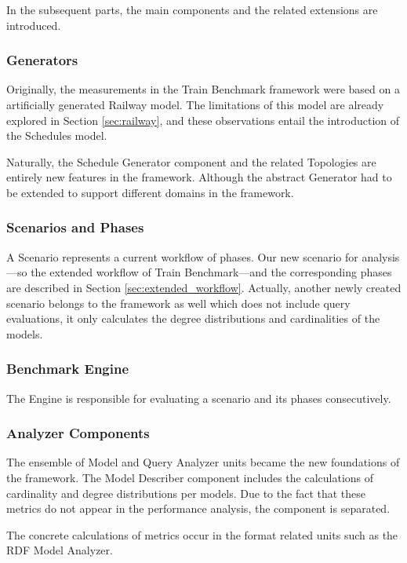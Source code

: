 In the subsequent parts, the main components and the related extensions are introduced.

\subsubsection{Generators}
Originally, the measurements in the Train Benchmark framework were based on a artificially generated \textsf{Railway} model. The limitations of this model are already explored in Section \ref{sec:railway}, and these observations entail the introduction of the \textsf{Schedules} model.

Naturally, the \textsf{Schedule Generator} component and the related \textsf{Topologies} are entirely new features in the framework. Although the abstract \textsf{Generator} had to be extended to support different domains in the framework.

\subsubsection{Scenarios and Phases}

A \textsf{Scenario} represents a current workflow of phases. Our new scenario for analysis---so the extended workflow of Train Benchmark---and the corresponding phases are described in Section \ref{sec:extended_workflow}. Actually, another newly created scenario belongs to the framework as well which does not include query evaluations, it only calculates the degree distributions and cardinalities of the models.

\subsubsection{Benchmark Engine}
The \textsf{Engine} is responsible for evaluating a scenario and its phases consecutively.

\subsubsection{Analyzer Components}

The ensemble of \textsf{Model} and \textsf{Query Analyzer} units became the new foundations of the framework. The \textsf{Model Describer} component includes the calculations of cardinality and degree distributions per models. Due to the fact that these metrics do not appear in the performance analysis, the component is separated.

The concrete calculations of metrics occur in the format related units such as the \textsf{RDF Model Analyzer}.

